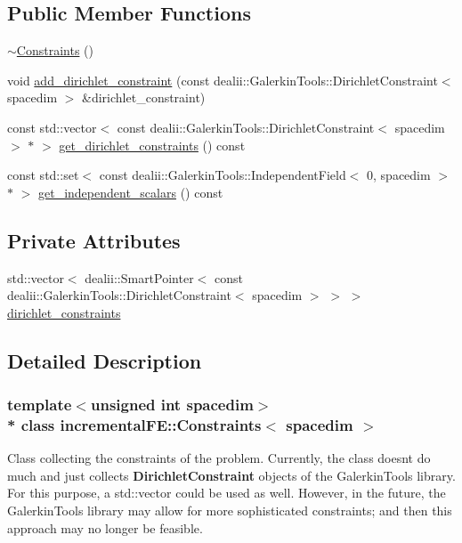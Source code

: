 \subsection*{Public Member Functions}
\begin{DoxyCompactItemize}
\item 
\hyperlink{classincremental_f_e_1_1_constraints_ab77495a668ae8925bd8095c2c80a8624}{$\sim$\+Constraints} ()
\item 
void \hyperlink{classincremental_f_e_1_1_constraints_a6f6a3580ea81a3cf8ce037fe98e46a15}{add\+\_\+dirichlet\+\_\+constraint} (const dealii\+::\+Galerkin\+Tools\+::\+Dirichlet\+Constraint$<$ spacedim $>$ \&dirichlet\+\_\+constraint)
\item 
const std\+::vector$<$ const dealii\+::\+Galerkin\+Tools\+::\+Dirichlet\+Constraint$<$ spacedim $>$ $\ast$ $>$ \hyperlink{classincremental_f_e_1_1_constraints_a070b000db6079a35095f0c277a773d66}{get\+\_\+dirichlet\+\_\+constraints} () const 
\item 
const std\+::set$<$ const dealii\+::\+Galerkin\+Tools\+::\+Independent\+Field$<$ 0, spacedim $>$ $\ast$ $>$ \hyperlink{classincremental_f_e_1_1_constraints_a958643ec784d58d1263d21ab20c99df1}{get\+\_\+independent\+\_\+scalars} () const 
\end{DoxyCompactItemize}
\subsection*{Private Attributes}
\begin{DoxyCompactItemize}
\item 
std\+::vector$<$ dealii\+::\+Smart\+Pointer$<$ const dealii\+::\+Galerkin\+Tools\+::\+Dirichlet\+Constraint$<$ spacedim $>$ $>$ $>$ \hyperlink{classincremental_f_e_1_1_constraints_aaa6042a72b76026d58416affbf056688}{dirichlet\+\_\+constraints}
\end{DoxyCompactItemize}


\subsection{Detailed Description}
\subsubsection*{template$<$unsigned int spacedim$>$\\*
class incremental\+F\+E\+::\+Constraints$<$ spacedim $>$}

Class collecting the constraints of the problem. Currently, the class doesn\textquotesingle{}t do much and just collects {\bf Dirichlet\+Constraint} objects of the Galerkin\+Tools library. For this purpose, a {\ttfamily std\+::vector} could be used as well. However, in the future, the Galerkin\+Tools library may allow for more sophisticated constraints; and then this approach may no longer be feasible.

